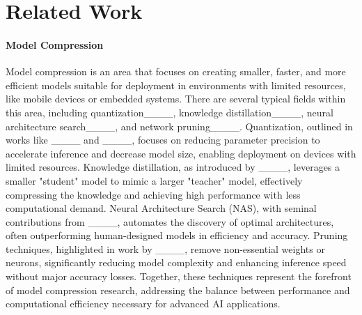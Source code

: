 \section{Related Work}
\paragraph{Model Compression}
Model compression is an area that focuses on creating smaller, faster, and more efficient models suitable for deployment in environments with limited resources, like mobile devices or embedded systems. There are several typical fields within this area, including quantization____, knowledge distillation____, neural architecture search____, and network pruning____. Quantization, outlined in works like ____ and ____, focuses on reducing parameter precision to accelerate inference and decrease model size, enabling deployment on devices with limited resources. Knowledge distillation, as introduced by ____, leverages a smaller "student" model to mimic a larger "teacher" model, effectively compressing the knowledge and achieving high performance with less computational demand. Neural Architecture Search (NAS), with seminal contributions from ____, automates the discovery of optimal architectures, often outperforming human-designed models in efficiency and accuracy. Pruning techniques, highlighted in work by ____, remove non-essential weights or neurons, significantly reducing model complexity and enhancing inference speed without major accuracy losses. Together, these techniques represent the forefront of model compression research, addressing the balance between performance and computational efficiency necessary for advanced AI applications.
